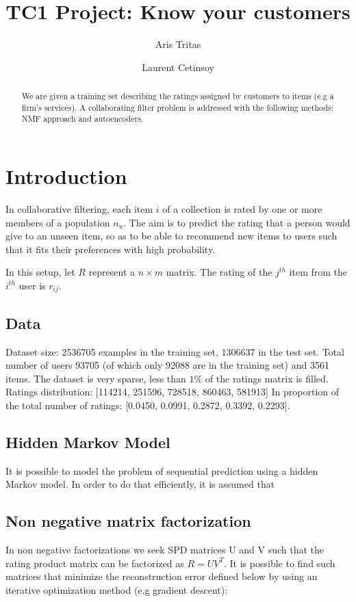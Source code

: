 \documentclass[10pt,twocolumn]{article}
\title{TC1 Project: Know your customers}
\author{Aris Tritas \and Laurent Cetinsoy}
\begin{document}
\maketitle

\begin{abstract}

We are given a training set describing the ratings assigned by customers to items (e.g a firm's services). 
A collaborating filter problem is addressed with the following methods: NMF approach and autoencoders.

\end{abstract}

\section{Introduction}

In collaborative filtering, each item $i$ of a collection is rated by one or more members of a population $n_u$. The aim is to predict the rating that a person would give to an unseen item, so as to be able to recommend new items to users such that it fits their preferences with high probability.

In this setup, let $R$ represent a $n \times m$ matrix. The rating of the $j^{th}$ item from the $i^{th}$ user is $r_{ij}$.

\subsection{Data}
Dataset size: 2536705 examples in the training set, 1306637 in the test set. Total number of users 93705 (of which only 92088 are in the training set) and 3561 items. The dataset is very sparse,  less than $1\% $ of the ratings matrix is filled.
Ratings distribution: [114214, 251596, 728518, 860463, 581913] In proportion of the total number of ratings: [0.0450, 0.0991, 0.2872, 0.3392, 0.2293].

\subsection{Hidden Markov Model}
It is possible to model the problem of sequential prediction using a hidden Markov model. In order to do that efficiently, it is assumed that 
\subsection{Non negative matrix factorization}

In non negative factorizations we seek SPD matrices U and V such that the rating product matrix can be factorized as $R = UV^T$. It is possible to find such matrices that minimize the reconstruction error defined below by using an iterative optimization method (e.g gradient descent): 
\end{document}
